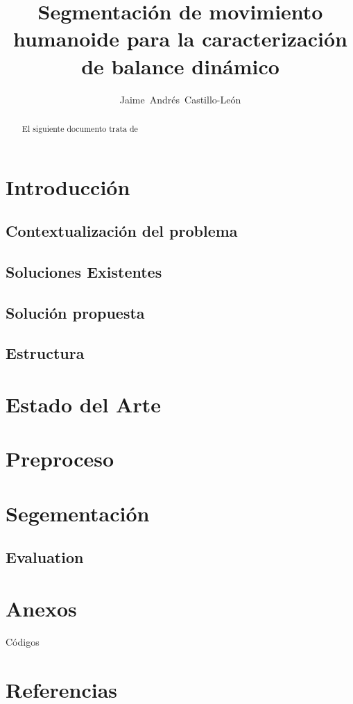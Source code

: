 \documentclass[10pt,twoside,twocolumn]{IEEEtran}
\title{Segmentación de movimiento humanoide para la caracterización de balance dinámico}
\author{Jaime~Andrés~Castillo-León}
\begin{document}
\maketitle
\begin{abstract}
El siguiente documento trata de  
\end{abstract}

\section{Introducción}
\label{sec:intro}

\subsection{Contextualización del problema}
\label{sec:contex}

\subsection{Soluciones Existentes}
\label{sec:solexis}

\subsection{Solución propuesta}
\label{sec:propu}

\subsection{Estructura}
\label{sec:estruct}


\section{Estado del Arte}
\label{sec:arte}

\section{Preproceso}
\label{sec:prepro}

\section{Segementación}
\label{sec:segm}

\subsection{Evaluation}
\label{sec:eval}

\section{Anexos}
\label{sec:anex}

Códigos

\section{Referencias}
\label{sec:refs}
\end{document}
